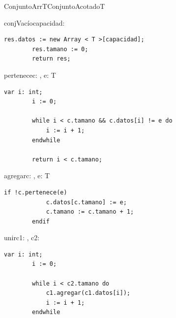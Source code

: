 \begin{module}{ConjuntoArr}{T}{ConjuntoAcotado}{T}




	\begin{proc}{conjVacío}{\In capacidad: \Int}{\moduletype}
		\begin{lstlisting}[numbers=none,frame=none]
		res.datos := new Array < T >[capacidad];
		res.tamano := 0;
		return res;
		\end{lstlisting}
	\end{proc}

	\begin{proc}{pertenece}{\In c: \moduletype, \In e: T}{\bool}
		\begin{lstlisting}[numbers=none,frame=none]
		var i: int;
		i := 0;

		while i < c.tamano && c.datos[i] != e do
			i := i + 1;
		endwhile

		return i < c.tamano;
		\end{lstlisting}
	\end{proc}

	\begin{proc}{agregar}{\Inout c: \moduletype, \In e: T}{}
		\begin{lstlisting}[numbers=none,frame=none]
		if !c.pertenece(e)
			c.datos[c.tamano] := e;
			c.tamano := c.tamano + 1;
		endif
		\end{lstlisting}
	\end{proc}

	\begin{proc}{unir}{\Inout c1: \moduletype, \In c2: \moduletype}{}
		\begin{lstlisting}[numbers=none,frame=none]
		var i: int;
		i := 0;

		while i < c2.tamano do
			c1.agregar(c1.datos[i]);
			i := i + 1;
		endwhile
		\end{lstlisting}
	\end{proc}


\end{module}
